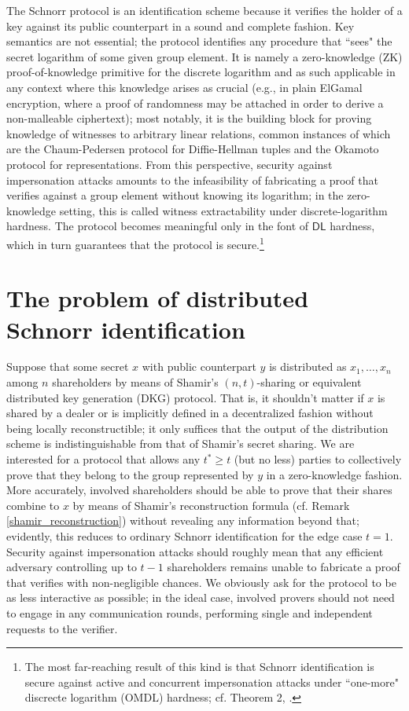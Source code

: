 \documentclass{iacrtrans}
\begin{document}
The Schnorr protocol is an identification scheme
because it verifies the holder of a key
against its public counterpart in a sound and complete fashion.
Key semantics are not essential;
the protocol identifies any procedure
that ``sees" the secret logarithm of some given group element.
It is namely a zero-knowledge (ZK) proof-of-knowledge primitive
for the discrete logarithm and as such applicable in any context where this knowledge arises as crucial
(e.g., in plain ElGamal encryption,
where a proof of randomness
may be attached in order to derive a non-malleable ciphertext);
most notably, it is the building block
for proving knowledge of witnesses to arbitrary linear relations,
common instances of which are
the Chaum-Pedersen protocol for Diffie-Hellman tuples
and the Okamoto protocol for representations.
From this perspective,
security against impersonation attacks
amounts to the infeasibility of fabricating
a proof that verifies against a group element
without knowing its logarithm;
in the zero-knowledge setting,
this is called witness extractability
under discrete-logarithm hardness.
The protocol becomes meaningful
only in the font of $\mathsf{DL}$ hardness,
which in turn guarantees
that the protocol is secure.\footnote{The
most far-reaching result of this kind is that
Schnorr identification is secure
against active and concurrent impersonation attacks
under ``one-more" discrecte logarithm (OMDL) hardness;
cf. Theorem 2, \cite{paper_bellare_palacio}.}

\section{The problem of distributed Schnorr identification}\label{section_problem}

Suppose that some secret $x$
with public counterpart $y$ is distributed as $x_1, \dots, x_n$
among $n$ shareholders by means of Shamir's $(n, t)$-sharing
or equivalent distributed key generation (DKG)
protocol. That is, it shouldn't matter if $x$ is shared by
a dealer or is implicitly defined in a decentralized
fashion without being locally reconstructible;
it only suffices that the output of the
distribution scheme is indistinguishable
from that of Shamir's secret sharing.
We are interested for a protocol that allows any
$t^* \ge t$ (but no less) parties to collectively prove
that they belong to the group represented by $y$
in a zero-knowledge fashion. More accurately, involved shareholders
should be able to prove that their shares
combine to $x$ by means of Shamir's reconstruction formula
(cf. Remark \ref{shamir_reconstruction})
without revealing any information beyond that;
evidently, this reduces to ordinary Schnorr identification
for the edge case $t=1$.
Security against impersonation attacks should roughly mean that any
efficient adversary controlling up to $t-1$ shareholders
remains unable to fabricate a proof that verifies
with non-negligible chances.
We obviously ask for the protocol to be
as less interactive as possible;
in the ideal case, involved provers should not need to
engage in any communication rounds, performing single and
independent requests to the verifier.
\end{document}
